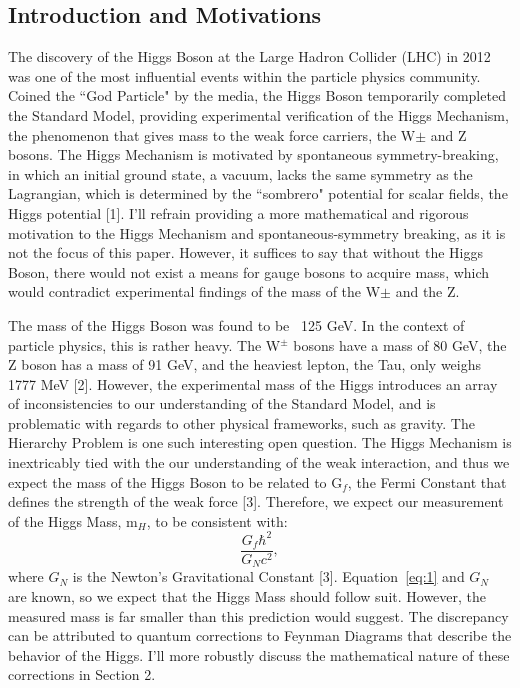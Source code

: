 \documentclass{article}
\begin{document}
\subsection{Introduction and Motivations}
The discovery of the Higgs Boson at the Large Hadron Collider (LHC) in 2012 was one of the most influential events within the particle physics community. Coined the ``God Particle"  by the media, the Higgs Boson temporarily completed the Standard Model, providing experimental verification of the Higgs Mechanism, the phenomenon that gives mass to the weak force carriers, the W$\pm$ and Z bosons. The Higgs Mechanism is motivated by spontaneous symmetry-breaking, in which an initial ground state, a vacuum, lacks the same symmetry as the Lagrangian, which is determined by the ``sombrero"  potential for scalar fields, the Higgs potential [1]. I'll refrain providing a more mathematical and rigorous motivation to the Higgs Mechanism and spontaneous-symmetry breaking, as it is not the focus of this paper. However, it suffices to say that without the Higgs Boson, there would not exist a means for gauge bosons to acquire mass, which would contradict experimental findings of the mass of the W$\pm$ and the Z.
\par
The mass of the Higgs Boson was found to be ~125 GeV. In the context of particle physics, this is rather heavy. The W$^{\pm}$ bosons have a mass of 80 GeV, the Z boson has a mass of 91 GeV, and the heaviest lepton, the Tau, only weighs 1777 MeV [2]. However, the experimental mass of the Higgs introduces an array of inconsistencies to our understanding of the Standard Model, and is problematic with regards to other physical frameworks, such as gravity. The Hierarchy Problem is one such interesting open question. The Higgs Mechanism is inextricably tied with the our understanding of the weak interaction, and thus we expect the mass of the Higgs Boson to be related to G$_{f}$, the Fermi Constant that defines the strength of the weak force [3]. Therefore, we expect our measurement of the Higgs Mass, m$_{H}$, to be consistent with:
\begin{equation} \label{eq:1}
\frac{G_{f} \hbar^{2}}{G_{N} c^{2}},
\end{equation}
where $G_{N}$ is the Newton's Gravitational Constant [3]. Equation~\ref{eq:1} and $G_{N}$ are known, so we expect that the Higgs Mass should follow suit. However, the measured mass is far smaller than this prediction would suggest. The discrepancy can be attributed to quantum corrections to Feynman Diagrams that describe the behavior of the Higgs. I'll more robustly discuss the mathematical nature of these corrections in Section 2.
\end{document}
